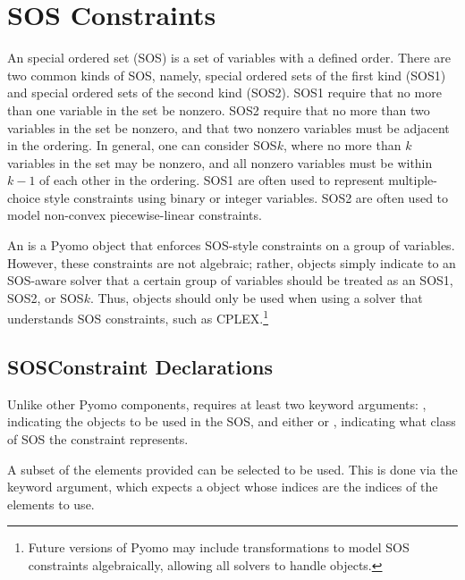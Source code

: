 \section{SOS Constraints}
  
  An special ordered set (SOS) is a set of variables with a defined
  order. There are two common kinds of SOS, namely, special ordered
  sets of the first kind (SOS1) and special ordered sets of the second
  kind (SOS2). SOS1 require that no more than one variable in the set
  be nonzero. SOS2 require that no more than two variables in the set
  be nonzero, and that two nonzero variables must be adjacent in the
  ordering. In general, one can consider SOS$k$, where no more than
  $k$ variables in the set may be nonzero, and all nonzero variables
  must be within $k-1$ of each other in the ordering. SOS1 are often
  used to represent multiple-choice style constraints using binary or
  integer variables. SOS2 are often used to model non-convex
  piecewise-linear constraints.

  An  is a Pyomo  object that
  enforces SOS-style constraints on a group of variables. However,
  these constraints are not algebraic; rather, 
  objects simply indicate to an SOS-aware solver that a certain group
  of variables should be treated as an SOS1, SOS2, or SOS$k$. Thus,
   objects should only be used when using a solver
  that understands SOS constraints, such as CPLEX.\footnote{Future
  versions of Pyomo may include transformations to model SOS
  constraints algebraically, allowing all solvers to handle
   objects.}

  \subsection{SOSConstraint Declarations}

    Unlike other Pyomo components,  requires at
    least two keyword arguments: , indicating the 
    objects to be used in the SOS, and either  or
    , indicating what class of SOS the constraint represents.
    

    A subset of the  elements provided can be selected to be
    used. This is done via the  keyword argument, which
    expects a  object whose indices are the indices of the
     elements to use.
    

